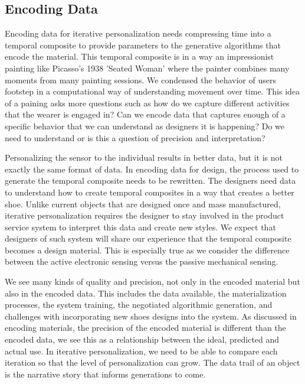 \subsection{Encoding Data}

Encoding data for iterative personalization needs compressing time into a temporal composite to provide parameters to the  generative algorithms that encode the material. This temporal composite is in a way an impressionist painting like Picasso's 1938 'Seated Woman' where the painter combines many moments from many painting sessions. We condensed the behavior of users footstep in a computational way of understanding movement over time. This idea of a paining asks more questions such as how do we capture different activities that the wearer is engaged in? Can we encode data that captures enough of a specific behavior that we can understand as designers it is happening?  Do we need to understand or is this a question of precision and interpretation?

Personalizing the sensor to the individual results in better data, but it is not exactly the same format of data. In  encoding data for design, the process used to generate the temporal composite needs to be rewritten. The designers need data to understand how to create temporal composites in a way that creates a better shoe. Unlike current objects that are designed once and mass manufactured, iterative personalization requires the designer to stay involved in the product service system to interpret this data and create new styles. We expect that designers of such system will share our experience that the temporal composite becomes a design material. This is especially true as we consider the difference between the active electronic sensing versus the passive mechanical sensing. 

We see many kinds of quality and precision, not only in the encoded material but also in the encoded data. This includes the data available, the materialization processes, the system training, the negotiated algorithmic generation, and challenges with incorporating new shoes designs into the system. As discussed in encoding materials, the precision of the encoded material is different than the encoded data, we see this as a relationship between the ideal, predicted and actual use. In iterative personalization, we need to be able to compare each iteration so that the level of personalization can grow. The data trail of an object is the narrative story that informs generations to come.  

